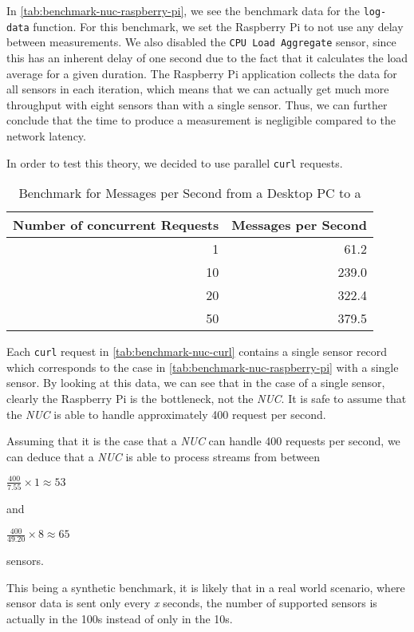 In \autoref{tab:benchmark-nuc-raspberry-pi}, we see the benchmark data for the \texttt{log-data}
function. For this benchmark, we set the Raspberry Pi to not use any delay between measurements. We
also disabled the \texttt{CPU Load Aggregate} sensor, since this has an inherent delay of one second
due to the fact that it calculates the load average for a given duration. The Raspberry Pi
application collects the data for all sensors in each iteration, which means that we can actually
get much more throughput with eight sensors than with a single sensor. Thus, we can further conclude
that the time to produce a measurement is negligible compared to the network latency.

In order to test this theory, we decided to use parallel \texttt{curl} requests.

\begin{table}[H]
  \centering
  \begin{tabular}{|r|r|}
    \hline
    Number of concurrent Requests & Messages per Second \\ \hline
                                1 &                61.2 \\ \hline
                               10 &               239.0 \\ \hline
                               20 &               322.4 \\ \hline
                               50 &               379.5 \\ \hline
  \end{tabular}
  \caption{Benchmark for Messages per Second from a Desktop PC to a }
  \label{tab:benchmark-nuc-curl}
\end{table}

Each \texttt{curl} request in \autoref{tab:benchmark-nuc-curl} contains a single sensor record which
corresponds to the case in \autoref{tab:benchmark-nuc-raspberry-pi} with a single sensor. By looking
at this data, we can see that in the case of a single sensor, clearly the Raspberry Pi is the
bottleneck, not the \textit{NUC}. It is safe to assume that the \textit{NUC} is able to handle
approximately 400 request per second.

Assuming that it is the case that a \textit{NUC} can handle 400 requests per second, we can deduce
that a \textit{NUC} is able to process streams from between

$\frac{400}{7.55} \times 1 \approx 53$

and

$\frac{400}{49.20} \times 8 \approx 65$

sensors.

This being a synthetic benchmark, it is likely that in a real world scenario, where sensor data is
sent only every \textit{x} seconds, the number of supported sensors is actually in the 100s instead
of only in the 10s.
